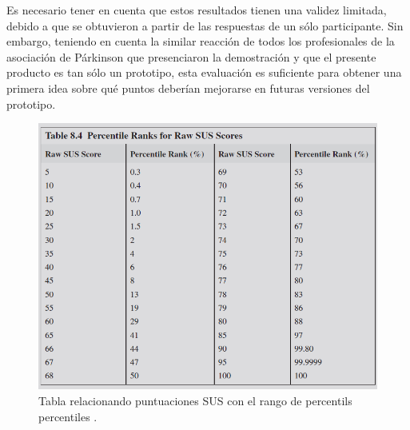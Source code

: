 Es necesario tener en cuenta que estos resultados tienen una validez limitada, debido a que se obtuvieron a partir de las respuestas de un sólo participante. Sin embargo, teniendo en cuenta la similar reacción de todos los profesionales de la asociación de Párkinson que presenciaron la demostración y que el presente producto es tan sólo un prototipo, esta evaluación es suficiente para obtener una primera idea sobre qué puntos deberían mejorarse en futuras versiones del prototipo.
        \begin{figure}[h]
        \centering
        \includegraphics[width=1\textwidth]{img/sus.png}
        \caption{Tabla relacionando puntuaciones SUS con el rango de percentils percentiles \cite{sauro2016quantifying}.}
        \label{fig:sus}
    \end{figure}